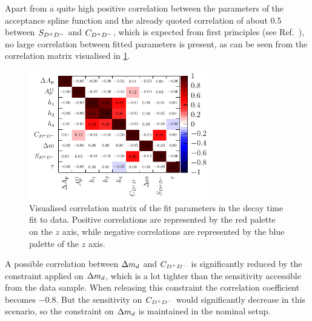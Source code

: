 Apart from a quite high positive correlation between the parameters of the
acceptance spline function and the already quoted correlation of about
\num{0.5} between $S_{{{D}^+}{{D}^-}}$ and $C_{{{D}^+}{{D}^-}}$, which is expected from first principles
(see Ref.~\cite{LHCb-ANA-2011-004}), no large correlation between fitted parameters
is present, as can be seen from the correlation matrix visualised in
\cref{fig:b02dd:decaytimefit:FullFitCorrMatrixHotCold}.
\begin{figure}[htb]
\centering
\includegraphics[width=0.7\textwidth]{07-B02DD/tikz/pdf/FitResultsCorrMatrix_RedBlueDiscrete_wText.pdf}
\caption{Visualised correlation matrix of the fit parameters in the decay time
fit to data. Positive correlations are represented by the red palette on the
$z$ axis, while negative correlations are represented by the blue palette of
the $z$ axis.}
\label{fig:b02dd:decaytimefit:FullFitCorrMatrixHotCold}
\end{figure}
A possible correlation between ${\Delta m_{{d}}}$ and $C_{{{D}^+}{{D}^-}}$ is significantly reduced by
the constraint applied on ${\Delta m_{{d}}}$, which is a lot tighter than the sensitivity
accessible from the data sample. When releasing this constraint the
correlation coefficient becomes \num{-0.8}. But the sensitivity on $C_{{{D}^+}{{D}^-}}$
would significantly decrease in this scenario, so the constraint on ${\Delta m_{{d}}}$ is
maintained in the nominal setup.

